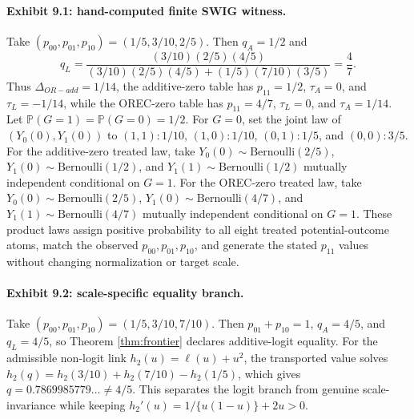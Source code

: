 \documentclass[11pt]{article}
\renewcommand{\Pr}{\mathbb{P}}
\theoremstyle{definition}
\theoremstyle{plain}
\theoremstyle{remark}
\begin{document}
\paragraph{Exhibit 9.1: hand-computed finite SWIG witness.}
Take \((p_{00},p_{01},p_{10})=(1/5,3/10,2/5)\).  Then \(q_A=1/2\) and
\[
q_L=\frac{(3/10)(2/5)(4/5)}{(3/10)(2/5)(4/5)+(1/5)(7/10)(3/5)}=\frac{4}{7}.
\]
Thus \(\Delta_{OR-add}=1/14\), the additive-zero table has \(p_{11}=1/2\), \(\tau_A=0\), and \(\tau_L=-1/14\), while the OREC-zero table has \(p_{11}=4/7\), \(\tau_L=0\), and \(\tau_A=1/14\).  Let \(\Pr(G=1)=\Pr(G=0)=1/2\).  For \(G=0\), set the joint law of \((Y_0(0),Y_1(0))\) to \((1,1):1/10\), \((1,0):1/10\), \((0,1):1/5\), and \((0,0):3/5\).  For the additive-zero treated law, take \(Y_0(0)\sim\mathrm{Bernoulli}(2/5)\), \(Y_1(0)\sim\mathrm{Bernoulli}(1/2)\), and \(Y_1(1)\sim\mathrm{Bernoulli}(1/2)\) mutually independent conditional on \(G=1\).  For the OREC-zero treated law, take \(Y_0(0)\sim\mathrm{Bernoulli}(2/5)\), \(Y_1(0)\sim\mathrm{Bernoulli}(4/7)\), and \(Y_1(1)\sim\mathrm{Bernoulli}(4/7)\) mutually independent conditional on \(G=1\).  These product laws assign positive probability to all eight treated potential-outcome atoms, match the observed \(p_{00},p_{01},p_{10}\), and generate the stated \(p_{11}\) values without changing normalization or target scale.

\paragraph{Exhibit 9.2: scale-specific equality branch.}
Take \((p_{00},p_{01},p_{10})=(1/5,3/10,7/10)\).  Then \(p_{01}+p_{10}=1\), \(q_A=4/5\), and \(q_L=4/5\), so Theorem \ref{thm:frontier} declares additive-logit equality.  For the admissible non-logit link \(h_2(u)=\ell(u)+u^2\), the transported value solves \(h_2(q)=h_2(3/10)+h_2(7/10)-h_2(1/5)\), which gives \(q=0.7869985779\ldots\neq4/5\).  This separates the logit branch from genuine scale-invariance while keeping \(h_2'(u)=1/\{u(1-u)\}+2u>0\).
\end{document}
